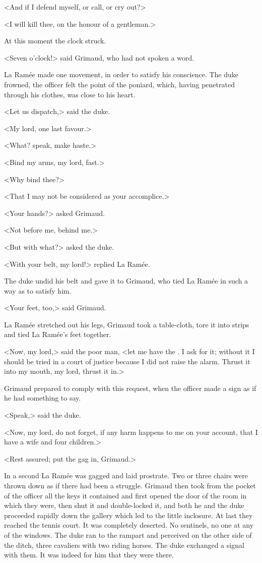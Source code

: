 <And if I defend myself, or call, or cry out?>

<I will kill thee, on the honour of a gentleman.>

At this moment the clock struck.

<Seven o'clock!> said Grimaud, who had not spoken a word.

La Ramée made one movement, in order to satisfy his conscience. The duke frowned, the officer felt the point of the poniard, which, having penetrated through his clothes, was close to his heart.

<Let us dispatch,> said the duke.

<My lord, one last favour.>

<What? speak, make haste.>

<Bind my arms, my lord, fast.>

<Why bind thee?>

<That I may not be considered as your accomplice.>

<Your hands?> asked Grimaud.

<Not before me, behind me.>

<But with what?> asked the duke.

<With your belt, my lord!> replied La Ramée.

The duke undid his belt and gave it to Grimaud, who tied La Ramée in such a way as to satisfy him.

<Your feet, too,> said Grimaud.

La Ramée stretched out his legs, Grimaud took a table-cloth, tore it into strips and tied La Ramée's feet together.

<Now, my lord,> said the poor man, <let me have the . I ask for it; without it I should be tried in a court of justice because I did not raise the alarm. Thrust it into my mouth, my lord, thrust it in.>

Grimaud prepared to comply with this request, when the officer made a sign as if he had something to say.

<Speak,> said the duke.

<Now, my lord, do not forget, if any harm happens to me on your account, that I have a wife and four children.>

<Rest assured; put the gag in, Grimaud.>

In a second La Ramée was gagged and laid prostrate. Two or three chairs were thrown down as if there had been a struggle. Grimaud then took from the pocket of the officer all the keys it contained and first opened the door of the room in which they were, then shut it and double-locked it, and both he and the duke proceeded rapidly down the gallery which led to the little inclosure. At last they reached the tennis court. It was completely deserted. No sentinels, no one at any of the windows. The duke ran to the rampart and perceived on the other side of the ditch, three cavaliers with two riding horses. The duke exchanged a signal with them. It was indeed for him that they were there.

